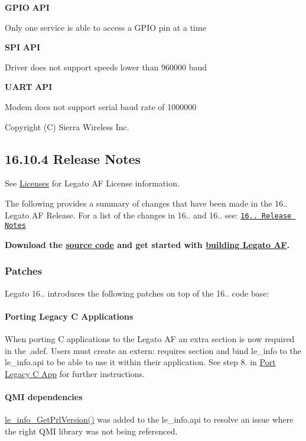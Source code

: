 {\bfseries G\+P\+IO} {\bfseries A\+PI} 
\begin{DoxyItemize}
\item Only one service is able to access a G\+P\+IO pin at a time
\end{DoxyItemize}

{\bfseries S\+PI} {\bfseries A\+PI} 
\begin{DoxyItemize}
\item Driver does not support speeds lower than 960000 baud
\end{DoxyItemize}

{\bfseries U\+A\+RT} {\bfseries A\+PI} 
\begin{DoxyItemize}
\item Modem does not support serial baud rate of 1000000
\end{DoxyItemize}

Copyright (C) Sierra Wireless Inc. \hypertarget{releaseNotes16104}{}\subsection{16.10.4 Release Notes}\label{releaseNotes16104}
See \hyperlink{aboutLicenses}{Licenses} for Legato AF License information.

The following provides a summary of changes that have been made in the 16.. Legato AF Release. For a list of the changes in 16.. and 16.. see\+: \href{http://legato.io/legato-docs/16_10/Legato_16_10_1_ReleaseNotes.pdf}{\tt 16.. Release Notes}

{\bfseries  Download the \hyperlink{aboutReleaseInfo}{source code} and get started with \hyperlink{basicBuild}{building Legato AF}. }\hypertarget{releaseNotes16104_rn16_10_4_Patches}{}\subsubsection{Patches}\label{releaseNotes16104_rn16_10_4_Patches}
Legato 16.. introduces the following patches on top of the 16.. code base\+:\hypertarget{releaseNotes16104_rn16_10_4_Patches_Porting}{}\paragraph{Porting Legacy C Applications}\label{releaseNotes16104_rn16_10_4_Patches_Porting}
When porting C applications to the Legato AF an extra section is now required in the {\ttfamily }.adef. Users must create an {\ttfamily extern\+:} {\ttfamily requires} section and bind le\+\_\+info to the le\+\_\+info.\+api to be able to use it within their application. See step 8. in \hyperlink{howToPortLegacyC}{Port Legacy C App} for further instructions.\hypertarget{releaseNotes16104_rn16_10_4_Patches_info}{}\paragraph{Q\+M\+I dependencies}\label{releaseNotes16104_rn16_10_4_Patches_info}
\hyperlink{le__info__interface_8h_ab12105ea6f654c3124ec812234e0f1fa}{le\+\_\+info\+\_\+\+Get\+Prl\+Version()} was added to the le\+\_\+info.\+api to resolve an issue where the right Q\+MI library was not being referenced.

